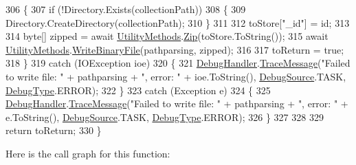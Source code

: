\begin{DoxyCode}
306             \{
307                 \textcolor{keywordflow}{if} (!Directory.Exists(collectionPath))
308                 \{
309                     Directory.CreateDirectory(collectionPath);
310                 \}
311 
312                 toStore[\textcolor{stringliteral}{"\_id"}] = id;
313 
314                 byte[] zipped = await \mbox{\hyperlink{class_little_weeb_library_1_1_static_classes_1_1_utility_methods}{UtilityMethods}}.\mbox{\hyperlink{class_little_weeb_library_1_1_static_classes_1_1_utility_methods_a16933213071d531063b29979e7b55fe8}{Zip}}(toStore.ToString());
315                 await \mbox{\hyperlink{class_little_weeb_library_1_1_static_classes_1_1_utility_methods}{UtilityMethods}}.\mbox{\hyperlink{class_little_weeb_library_1_1_static_classes_1_1_utility_methods_a6542a3a6ea0aed6b4d78bb44a4a7d9d7}{WriteBinaryFile}}(pathparsing, zipped);
316 
317                 toReturn = \textcolor{keyword}{true};
318             \}
319             \textcolor{keywordflow}{catch} (IOException ioe)
320             \{
321                 \mbox{\hyperlink{class_little_weeb_library_1_1_handlers_1_1_data_base_handler_aa474a1f934032623ffb3ae5eb156148b}{DebugHandler}}.\mbox{\hyperlink{interface_little_weeb_library_1_1_handlers_1_1_i_debug_handler_a2e405bc3492e683cd3702fae125221bc}{TraceMessage}}(\textcolor{stringliteral}{"Failed to write file: "} + pathparsing + \textcolor{stringliteral}{
      ", error: "} + ioe.ToString(), \mbox{\hyperlink{namespace_little_weeb_library_1_1_handlers_a2a6ca0775121c9c503d58aa254d292be}{DebugSource}}.TASK, \mbox{\hyperlink{namespace_little_weeb_library_1_1_handlers_ab66019ed40462876ec4e61bb3ccb0a62}{DebugType}}.ERROR);
322             \}
323             \textcolor{keywordflow}{catch} (Exception e)
324             \{
325                 \mbox{\hyperlink{class_little_weeb_library_1_1_handlers_1_1_data_base_handler_aa474a1f934032623ffb3ae5eb156148b}{DebugHandler}}.\mbox{\hyperlink{interface_little_weeb_library_1_1_handlers_1_1_i_debug_handler_a2e405bc3492e683cd3702fae125221bc}{TraceMessage}}(\textcolor{stringliteral}{"Failed to write file: "} + pathparsing + \textcolor{stringliteral}{
      ", error: "} + e.ToString(), \mbox{\hyperlink{namespace_little_weeb_library_1_1_handlers_a2a6ca0775121c9c503d58aa254d292be}{DebugSource}}.TASK, \mbox{\hyperlink{namespace_little_weeb_library_1_1_handlers_ab66019ed40462876ec4e61bb3ccb0a62}{DebugType}}.ERROR);
326             \}          
327             
328 
329             \textcolor{keywordflow}{return} toReturn;
330         \}
\end{DoxyCode}
Here is the call graph for this function\+:\nopagebreak

